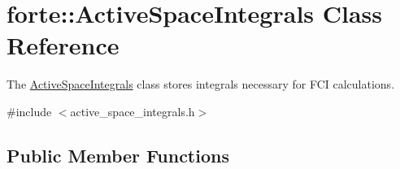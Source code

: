 \hypertarget{classforte_1_1_active_space_integrals}{}\section{forte\+:\+:Active\+Space\+Integrals Class Reference}
\label{classforte_1_1_active_space_integrals}


The \mbox{\hyperlink{classforte_1_1_active_space_integrals}{Active\+Space\+Integrals}} class stores integrals necessary for F\+CI calculations.  




{\ttfamily \#include $<$active\+\_\+space\+\_\+integrals.\+h$>$}

\subsection*{Public Member Functions}
